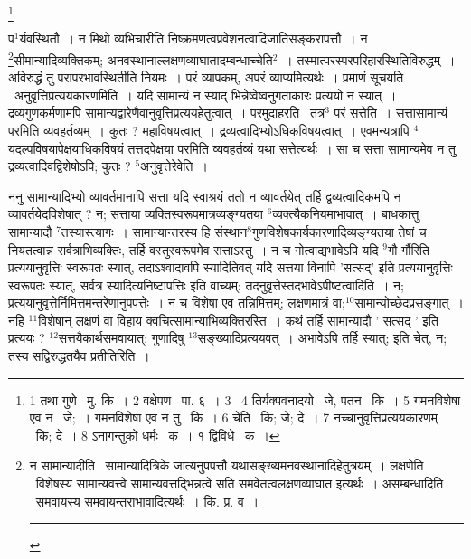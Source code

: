 \documentclass[11pt, openany]{book}
\newcommand\blfootnote[1]{%
 \begingroup
 \renewcommand\thefootnote{}\footnote{#1}%
 \addtocounter{footnote}{-1}%
 \endgroup
}
\begin{document}
\blfootnote{1 तथा गुणे  \textendash\ मु. कि~। 2 वक्षेपण  \textendash\ पा. ६~। 3  \textendash\ 4 तिर्यक्पवनादयो  \textendash\ जे, पतन  \textendash\ कि~। 5 गमनविशेषा एव न  \textendash\ जे;~। गमनविशेषा एव न तु  \textendash\ कि~। 6 चेति  \textendash\ कि; जे; दे~। 7 नच्चानुवृत्तिप्रत्ययकारणम्  \textendash\ कि; दे~। 8 ऽनागन्तुको धर्मः  \textendash\ क~। १ द्विविधे  \textendash\ क~।}

\newpage
\noindent
प$^1$र्यवस्थितौ~। न मिथो व्यभिचारीति निष्क्रमणत्वप्रवेशनत्वादिजातिसङ्करापत्तौ~। न \renewcommand{\thefootnote}{१}\footnote{न सामान्यादीति  \textendash\ सामान्यादित्रिके जात्यनुपपत्तौ यथासङ्ख्यमनवस्थानादिहेतुत्रयम्~। लक्षणेति  \textendash\ विशेषस्य सामान्यवत्त्वे सामान्यवत्तद्भिन्नत्वे सति समवेतत्वलक्षणव्याघात इत्यर्थः~। असम्बन्धादिति  \textendash\ समवायस्य समवायन्तराभावादित्यर्थः~। कि. प्र. व~। \rule{0.4\linewidth}{0.5pt}}सीमान्यादिव्यक्तिकम्; अनवस्थानाल्लक्षणव्याघातादम्बन्धाच्चेति$^2$~। तस्मात्परस्परपरिहारस्थितिविरुद्धम्~। अविरुद्धं तु परापरभावस्थितीति नियमः~। {\knu परं} व्यापकम्, {\knu अपरं} व्याप्यमित्यर्थः~। प्रमाणं सूचयति \textendash\ {\knu अनुवृत्तिप्रत्ययकारणमिति}~। यदि सामान्यं न स्याद् भिन्नेष्वेष्वनुगताकारः प्रत्ययो न स्यात्~। द्रव्यगुणकर्मणामपि सामान्यद्वारेणैवानुवृत्तिप्रत्ययहेतुत्वात्~। परमुदाहरति \textendash\ {\knu तत्र$^3$ परं सत्ते}ति~। सत्तासामान्यं परमिति व्यवहर्तव्यम्~। कुतः ? महाविषयत्वात्~। द्रव्यत्वादिभ्योऽधिकविषयत्वात्~। एवमन्यत्रापि ${}^4$यदल्पविषयापेक्षयाधिकविषयं तत्तदपेक्षया परमिति व्यवहर्तव्यं यथा सत्तेत्यर्थः~। सा च सत्ता सामान्यमेव न तु द्रव्यत्वादिवद्विशेषोऽपि; कुतः ? ${}^5$अनुवृत्तेरेवेति~।

ननु सामान्यादिभ्यो व्यावर्तमानापि सत्ता यदि स्वाश्रयं ततो न व्यावर्तयेत् तर्हि द्वव्यत्वादिकमपि न व्यावर्तयेदविशेषात् ? न; सत्ताया व्यक्तिस्वरूपमात्रव्यङ्ग्यतया ${}^6$व्यक्त्यैकनियमाभावात्~। बाधकात्तु सामान्यादौ ${}^7$तस्यास्त्यागः~। सामान्यान्तरस्य हि संस्थान$^8$गुणविशेषकार्यकारणादिव्यङ्ग्यतया तेषां च नियतत्वान्न सर्वत्राभिव्यक्तिः, तर्हि वस्तुस्वरूपमेव सत्ताऽस्तु~। न च गोत्वाद्यभावेऽपि यदि ${}^9$गौ र्गौरिति प्रत्ययानुवृत्तिः स्वरूपतः स्यात्, तदाऽश्वादावपि स्यादितिवत् यदि सत्तया विनापि 'सत्सद्' इति प्रत्ययानुवृत्तिः स्वरूपतः स्यात्, सर्वत्र स्यादित्यनिष्टापत्तिः इति वाच्यम्; तदनुवृत्तेस्तदभावेऽपीष्टत्वादिति~। न; प्रत्ययानुवृत्तेर्निमित्तमन्तरेणानुपपत्तेः~। न च विशेषा एव तन्निमित्तम्; लक्षणमात्रं वा;${}^10$सामान्योच्छेदप्रसङ्गात्~। नहि ${}^11$विशेषान् लक्षणं वा विहाय क्वचित्सामान्याभिव्यक्तिरस्ति~। कथं तर्हि सामान्यादौ ' सत्सद् ' इति प्रत्ययः ? ${}^12$सत्तयैकार्थसमवायात्; गुणादिषु ${}^13$सङ्ख्यादिप्रत्ययवत्~। अभावेऽपि तर्हि स्यात्; इति चेत्, न; तस्य सद्विरुद्धतयैव प्रतीतिरिति~।
\end{document}
